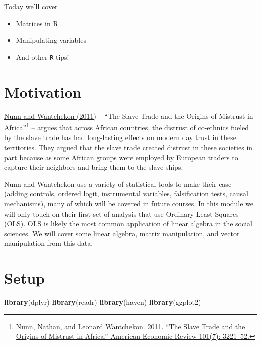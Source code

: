 \documentclass[]{book}
\newenvironment{Shaded}{\begin{snugshade}}{\end{snugshade}}
\newcommand{\KeywordTok}[1]{\textcolor[rgb]{0.13,0.29,0.53}{\textbf{#1}}}
\newcommand{\NormalTok}[1]{#1}
\providecommand{\tightlist}{%
  \setlength{\itemsep}{0pt}\setlength{\parskip}{0pt}}
\let\rmarkdownfootnote\footnote%
\def\footnote{\protect\rmarkdownfootnote}
\theoremstyle{definition}
\theoremstyle{definition}
\theoremstyle{definition}
\theoremstyle{remark}
\begin{document}
Today we'll cover

\begin{itemize}
\tightlist
\item
  Matrices in R
\item
  Manipulating variables
\item
  And other \texttt{R} tips!
\end{itemize}

\section{Motivation}\label{motivation-1}

\href{https://dash.harvard.edu/bitstream/handle/1/11986331/nunn-slave-trade.pdf}{Nunn
and Wantchekon (2011)} -- ``The Slave Trade and the Origins of Mistrust
in Africa''\footnote{\href{https://dash.harvard.edu/bitstream/handle/1/11986331/nunn-slave-trade.pdf}{Nunn,
  Nathan, and Leonard Wantchekon. 2011. ``The Slave Trade and the
  Origins of Mistrust in Africa.'' American Economic Review 101(7):
  3221--52.}} -- argues that across African countries, the distrust of
co-ethnics fueled by the slave trade has had long-lasting effects on
modern day trust in these territories. They argued that the slave trade
created distrust in these societies in part because as some African
groups were employed by European traders to capture their neighbors and
bring them to the slave ships.

Nunn and Wantchekon use a variety of statistical tools to make their
case (adding controls, ordered logit, instrumental variables,
falsification tests, causal mechanisms), many of which will be covered
in future courses. In this module we will only touch on their first set
of analysis that use Ordinary Least Squares (OLS). OLS is likely the
most common application of linear algebra in the social sciences. We
will cover some linear algebra, matrix manipulation, and vector
manipulation from this data.

\section{Setup}\label{setup}

\begin{Shaded}
\begin{Highlighting}[]
\KeywordTok{library}\NormalTok{(dplyr)}
\KeywordTok{library}\NormalTok{(readr)}
\KeywordTok{library}\NormalTok{(haven)}
\KeywordTok{library}\NormalTok{(ggplot2)}
\end{Highlighting}
\end{Shaded}
\end{document}
